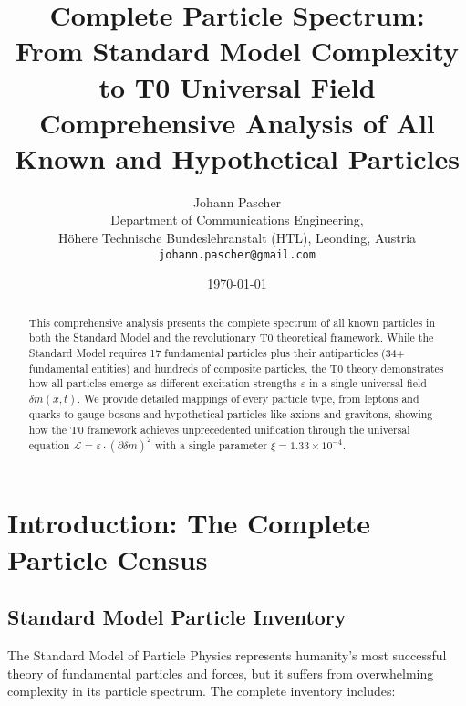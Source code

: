 \documentclass[12pt,a4paper]{article}
\newcommand{\deltam}{\delta m}
\newcommand{\xipar}{\xi}
\newcommand{\Lag}{\mathcal{L}}
\begin{document}
	
	\title{Complete Particle Spectrum: \\
		From Standard Model Complexity to T0 Universal Field \\
		\large Comprehensive Analysis of All Known and Hypothetical Particles}
	\author{Johann Pascher\\
		Department of Communications Engineering, \\H{\"o}here Technische Bundeslehranstalt (HTL), Leonding, Austria\\
		\texttt{johann.pascher@gmail.com}}
	\date{\today}
	
	\maketitle
	
	\begin{abstract}
		This comprehensive analysis presents the complete spectrum of all known particles in both the Standard Model and the revolutionary T0 theoretical framework. While the Standard Model requires 17 fundamental particles plus their antiparticles (34+ fundamental entities) and hundreds of composite particles, the T0 theory demonstrates how all particles emerge as different excitation strengths $\varepsilon$ in a single universal field $\deltam(x,t)$. We provide detailed mappings of every particle type, from leptons and quarks to gauge bosons and hypothetical particles like axions and gravitons, showing how the T0 framework achieves unprecedented unification through the universal equation $\Lag = \varepsilon \cdot (\partial \deltam)^2$ with a single parameter $\xipar = 1.33 \times 10^{-4}$.
	\end{abstract}
	
	\tableofcontents
	\newpage
	
	\section{Introduction: The Complete Particle Census}
	
	\subsection{Standard Model Particle Inventory}
	
	The Standard Model of Particle Physics represents humanity's most successful theory of fundamental particles and forces, but it suffers from overwhelming complexity in its particle spectrum. The complete inventory includes:
	
\end{document}
